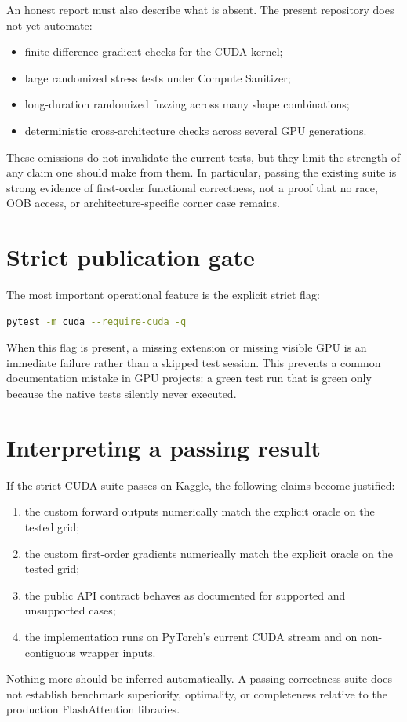 An honest report must also describe what is absent. The present repository does not yet automate:
\begin{itemize}
  \item finite-difference gradient checks for the CUDA kernel;
  \item large randomized stress tests under Compute Sanitizer;
  \item long-duration randomized fuzzing across many shape combinations;
  \item deterministic cross-architecture checks across several GPU generations.
\end{itemize}
These omissions do not invalidate the current tests, but they limit the strength of any claim one should make from them. In particular, passing the existing suite is strong evidence of first-order functional correctness, not a proof that no race, OOB access, or architecture-specific corner case remains.

\section{Strict publication gate}

The most important operational feature is the explicit strict flag:
\begin{lstlisting}[language=bash,caption={Strict CUDA correctness gate.}]
pytest -m cuda --require-cuda -q
\end{lstlisting}
When this flag is present, a missing extension or missing visible GPU is an immediate failure rather than a skipped test session. This prevents a common documentation mistake in GPU projects: a green test run that is green only because the native tests silently never executed.

\section{Interpreting a passing result}

If the strict CUDA suite passes on Kaggle, the following claims become justified:
\begin{enumerate}
  \item the custom forward outputs numerically match the explicit oracle on the tested grid;
  \item the custom first-order gradients numerically match the explicit oracle on the tested grid;
  \item the public API contract behaves as documented for supported and unsupported cases;
  \item the implementation runs on PyTorch's current CUDA stream and on non-contiguous wrapper inputs.
\end{enumerate}
Nothing more should be inferred automatically. A passing correctness suite does not establish benchmark superiority, optimality, or completeness relative to the production FlashAttention libraries.
